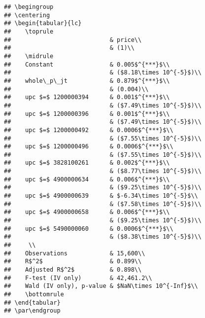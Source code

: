 \documentclass[
]{article}
\begin{document}
\begin{verbatim}
## \begingroup
## \centering
## \begin{tabular}{lc}
##    \toprule
##                            & price\\  
##                            & (1)\\  
##    \midrule 
##    Constant                & 0.005$^{***}$\\   
##                            & ($8.18\times 10^{-5}$)\\    
##    whole\_p\_jt            & 0.879$^{***}$\\   
##                            & (0.004)\\   
##    upc $=$ 1200000394      & 0.001$^{***}$\\   
##                            & ($7.49\times 10^{-5}$)\\    
##    upc $=$ 1200000396      & 0.001$^{***}$\\   
##                            & ($7.49\times 10^{-5}$)\\    
##    upc $=$ 1200000492      & 0.0006$^{***}$\\   
##                            & ($7.55\times 10^{-5}$)\\    
##    upc $=$ 1200000496      & 0.0006$^{***}$\\   
##                            & ($7.55\times 10^{-5}$)\\    
##    upc $=$ 3828100261      & 0.002$^{***}$\\   
##                            & ($8.77\times 10^{-5}$)\\    
##    upc $=$ 4900000634      & 0.006$^{***}$\\   
##                            & ($9.25\times 10^{-5}$)\\    
##    upc $=$ 4900000639      & $-6.34\times 10^{-5}$\\    
##                            & ($7.58\times 10^{-5}$)\\    
##    upc $=$ 4900000658      & 0.006$^{***}$\\   
##                            & ($9.25\times 10^{-5}$)\\    
##    upc $=$ 5490000060      & 0.0006$^{***}$\\   
##                            & ($8.38\times 10^{-5}$)\\    
##     \\
##    Observations            & 15,600\\  
##    R$^2$                   & 0.899\\  
##    Adjusted R$^2$          & 0.898\\  
##    F-test (IV only)        & 42,461.2\\  
##    Wald (IV only), p-value & $NaN\times 10^{-Inf}$\\   
##    \bottomrule
## \end{tabular}
## \par\endgroup
\end{verbatim}
\end{document}

